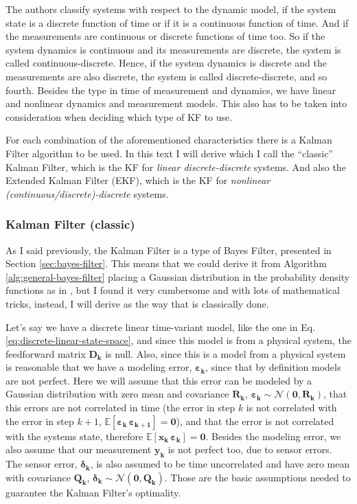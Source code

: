 \documentclass[12pt]{article}
\newcommand{\bvec}[1]{\mathbf{#1}} %
\newcommand{\mat}[1]{\mathbf{#1}}
\newcommand{\brac}[1]{\left[#1\right]} %
\newcommand{\parentheses}[1]{\left(#1\right)}
\newcommand{\mb}[1]{{\boldsymbol{#1}}} %
\newcommand{\expv}[1]{\mathbb{E}\brac{#1}} %
\newcommand{\normal}[2]{\mathcal{N}\parentheses{#1, #2}}
\begin{document}
The authors classify systems with respect to the dynamic model, if the system state is a discrete function of time or if it is a continuous function of time. And if the measurements are continuous or discrete functions of time too. So if the system dynamics is continuous and its measurements are discrete, the system is called continuous-discrete. Hence, if the system dynamics is discrete and the measurements are also discrete, the system is called discrete-discrete, and so fourth. Besides the type in time of measurement and dynamics, we have linear and nonlinear dynamics and measurement models. This also has to be taken into consideration when deciding which type of KF to use.

For each combination of the aforementioned characteristics there is a Kalman Filter algorithm to be used. In this text I will derive which I call the ``classic'' Kalman Filter, which is the KF for \textit{linear discrete-discrete} systems. And also the Extended Kalman Filter (EKF), which is the KF for \textit{nonlinear (continuous/discrete)-discrete} systems.

\subsubsection{Kalman Filter (classic)}
As I said previously, the Kalman Filter is a type of Bayes Filter, presented in Section \ref{sec:bayes-filter}. This means that we could derive it from Algorithm \ref{alg:general-bayes-filter} placing a Gaussian distribution in the probability density functions as in \cite[p.~45]{bongard2006probabilistic}, but I found it very cumbersome and with lots of mathematical tricks, instead, I will derive as the way that is classically done. 

Let's say we have a discrete linear time-variant model, like the one in Eq. \ref{eq:discrete-linear-state-space}, and since this model is from a physical system, the feedforward matrix $\mat{D_k}$ is null. Also, since this is a model from a physical system is reasonable that we have a modeling error, $\mb{\varepsilon}_\mathbf{k}$, since that by definition models are not perfect. Here we will assume that this error can be modeled by a Gaussian distribution with zero mean and covariance $\mat{R_k}$, $\mb{\varepsilon}_\mathbf{k} \sim \normal{\mat{0}}{\mat{R_k}}$, that this errors are not correlated in time (the error in step $k$ is not correlated with the error in step $k+1$, $\expv{\mb{\varepsilon}_\mathbf{k} \, \mb{\varepsilon}_\mathbf{k+1}} = \mat{0}$), and that the error is not correlated with the systems state, therefore $\expv{\bvec{x_k} \, \mb{\varepsilon}_\mathbf{k}} = \mat{0}$. Besides the modeling error, we also assume that our measurement $\bvec{y_k}$ is not perfect too, due to sensor errors. The sensor error, $\mb{\delta}_\mathbf{k}$, is also assumed to be time uncorrelated and have zero mean with covariance $\mat{Q_k}$, $\mb{\delta}_\mathbf{k} \sim \normal{\mat{0}}{\mat{Q_k}}$.
Those are the basic assumptions needed to guarantee the Kalman Filter's optimality.
\end{document}
